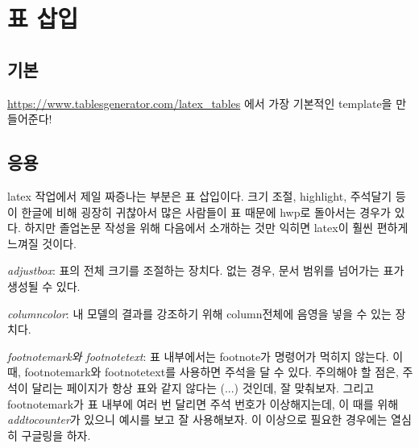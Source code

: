 \documentclass[ko,indentfirst,twoside,ms]{snuthesis_utf8}
\begin{document}
\clearpage 
\section{표 삽입}
\subsection{기본}
\url{https://www.tablesgenerator.com/latex_tables} 에서 가장 기본적인 template을 만들어준다!

\clearpage
\subsection{응용}
latex 작업에서 제일 짜증나는 부분은 표 삽입이다.
크기 조절, highlight, 주석달기 등이 한글에 비해 굉장히 귀찮아서 많은 사람들이 표 때문에 hwp로 돌아서는 경우가 있다.
하지만 졸업논문 작성을 위해 다음에서 소개하는 것만 익히면 latex이 훨씬 편하게 느껴질 것이다.

\textit{adjustbox}: 표의 전체 크기를 조절하는 장치다. 없는 경우, 문서 범위를 넘어가는 표가 생성될 수 있다.

\textit{columncolor}: 내 모델의 결과를 강조하기 위해 column전체에 음영을 넣을 수 있는 장치다.

\textit{footnotemark와 footnotetext}: 표 내부에서는 footnote가 명령어가 먹히지 않는다. 이 때, footnotemark와 footnotetext를 사용하면 주석을 달 수 있다.
주의해야 할 점은, 주석이 달리는 페이지가 항상 표와 같지 않다는 (...) 것인데, 잘 맞춰보자.
그리고 footnotemark가 표 내부에 여러 번 달리면 주석 번호가 이상해지는데, 이 때를 위해 \textit{addtocounter}가 있으니 예시를 보고 잘 사용해보자.
\newline
\newline
이 이상으로 필요한 경우에는 열심히 구글링을 하자.
\end{document}
